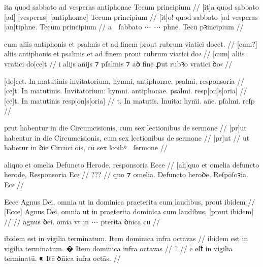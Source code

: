 \ex \bg
\gla
{}
ita quod sabbato ad vesperas antiphonae Tecum principium
//
\glRekonstrukcja
{}
[it]a quod sabbato [ad] [vesperas] [antiphonae] Tecum principium
//
\glUbytki
{}
[it]o! quod sabbato [ad vesperas [an]tiphne. Tecum principium
//
\glU
{}
a  ſabbato ⋯ ⋯ phne. Tecū pꝛincipium
//
\endgl
\xe



\ex \bg
\gla
{}
cum aliis antiphonis et psalmis et ad finem prout rubrum viatici docet. 
//
\glRekonstrukcja
{}
[cum?] aliis antiphonis et psalmis et ad finem prout rubrum viatici do⸗ 
//
\glUbytki
{}
[cum] aliis
{} {} {} {} {} {} {} {} 
vratici do[ce]t
//
\glU
{}
i alijs an̄ijs ⁊ pſalmis ⁊ aꝺ finē ꝓut rubꝛo vratici ꝺo⸗ 
//
\endgl
\xe



\ex \bg
\gla
{}
[do]cet. In matutinis invitatorium, hymni, antiphonae, psalmi, responsoria
//
\glRekonstrukcja
{}
[ce]t. In matutinis. Invitatorium: hymni. antiphonae. psalmi. resp[on]s[oria] 
//
\glUbytki
{}
[ce]t. In matutinis
{} {} {} {}
resp[on]s[oria]
//
\glU
{}
t. In matutīs. Inuita: hym̄i. an̄e. pſalmi. reſp
//
\endgl
\xe



\ex \bg
\gla
{}
prut habentur in die Circumcisionis, cum sex lectionibus de sermone
//
\glRekonstrukcja
{}
[pr]ut habentur in die Circumcisionis, cum sex lectionibus de sermone
//
\glUbytki
{}
[pr]ut
//
\glU
{}
ut habētur in ꝺie Circūciōis, cū sex lcōibꝰ  ſermone
//
\endgl
\xe

\ex \bg
\gla
{}
aliquo et
omelia Defuncto Herode, responsoria Ecce
//
\glRekonstrukcja
{}
[ali]quo et
omelia defuncto herode, Responsoria Ec⸗
//
\glUbytki
{}
???
//
\glU
{}
quo ⁊ omelia. Defuncto heroꝺe. Reſpōſoꝛia. Ec⸗
//
\endgl
\xe




\ex \bg
\gla
{}
Ecce Agnus Dei, omnia ut in dominica praeterita {} cum laudibus, prout ibidem
//
\glRekonstrukcja
{}
[Ecce] Agnus Dei, omnia ut in {} praeterita dominica cum laudibus, [prout ibidem]
//
\glUbytki
{}
//
\glU
{}
 agnus ꝺei. om̄ia vt in ⋯ p̄terita ꝺn̄ica cu   
//
\endgl
\xe



\ex \bg
\gla
{}
ibidem est in vigilia terminatum.
{} Item dominica infra octavas
//
\glRekonstrukcja
{}
ibidem est in vigilia terminatum.
� Item dominica infra octavas
//
\glUbytki
{?}
//
\glU
{}
ē eﬅ in vigilia terminatū. ⁌ Itē ꝺn̄ica iufra octās.
//
\endgl
\xe



